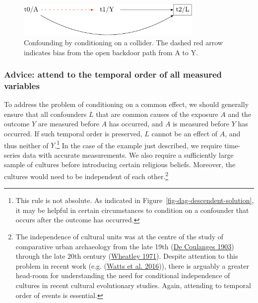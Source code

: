 \documentclass[
  singlecolumn]{article}
\begin{document}
\begin{figure}

{\centering \includegraphics[width=0.8\textwidth,height=\textheight]{causal-dags_files/figure-pdf/fig-dag-common-effect-1.pdf}

}

\caption{\label{fig-dag-common-effect}Confounding by conditioning on a
collider. The dashed red arrow indicates bias from the open backdoor
path from A to Y.}

\end{figure}

\hypertarget{advice-attend-to-the-temporal-order-of-all-measured-variables-1}{%
\subsubsection{Advice: attend to the temporal order of all measured
variables}\label{advice-attend-to-the-temporal-order-of-all-measured-variables-1}}

To address the problem of conditioning on a common effect, we should
generally ensure that all confounders \(L\) that are common causes of
the exposure \(A\) and the outcome \(Y\) are measured before \(A\) has
occurred, and \(A\) is measured before \(Y\) has occurred. If such
temporal order is preserved, \(L\) cannot be an effect of \(A\), and
thus neither of \(Y\).\footnote{This rule is not absolute. As indicated
  in Figure~\ref{fig-dag-descendent-solution}, it may be helpful in
  certain circumstances to condition on a confounder that occurs after
  the outcome has occurred.} In the case of the example just described,
we require time-series data with accurate measurements. We also require
a sufficiently large sample of cultures before introducing certain
religious beliefs. Moreover, the cultures would need to be independent
of each other.\footnote{The independence of cultural units was at the
  centre of the study of comparative urban archaeology from the late
  19th (\protect\hyperlink{ref-decoulanges1903}{De Coulanges 1903})
  through the late 20th century
  (\protect\hyperlink{ref-wheatley1971}{Wheatley 1971}). Despite
  attention to this problem in recent work (e.g.
  (\protect\hyperlink{ref-watts2016}{Watts et al. 2016})), there is
  arguably a greater head-room for understanding the need for
  conditional independence of cultures in recent cultural evolutionary
  studies. Again, attending to temporal order of events is essential.}
\end{document}
